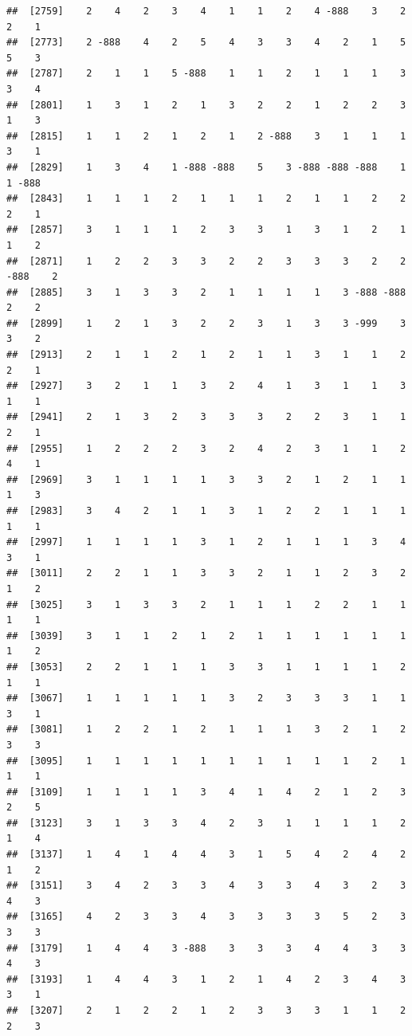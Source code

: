 \documentclass[
  12pt,
  openany]{book}
\begin{document}
\begin{verbatim}
##  [2759]    2    4    2    3    4    1    1    2    4 -888    3    2    2    1
##  [2773]    2 -888    4    2    5    4    3    3    4    2    1    5    5    3
##  [2787]    2    1    1    5 -888    1    1    2    1    1    1    3    3    4
##  [2801]    1    3    1    2    1    3    2    2    1    2    2    3    1    3
##  [2815]    1    1    2    1    2    1    2 -888    3    1    1    1    3    1
##  [2829]    1    3    4    1 -888 -888    5    3 -888 -888 -888    1    1 -888
##  [2843]    1    1    1    2    1    1    1    2    1    1    2    2    2    1
##  [2857]    3    1    1    1    2    3    3    1    3    1    2    1    1    2
##  [2871]    1    2    2    3    3    2    2    3    3    3    2    2 -888    2
##  [2885]    3    1    3    3    2    1    1    1    1    3 -888 -888    2    2
##  [2899]    1    2    1    3    2    2    3    1    3    3 -999    3    3    2
##  [2913]    2    1    1    2    1    2    1    1    3    1    1    2    2    1
##  [2927]    3    2    1    1    3    2    4    1    3    1    1    3    1    1
##  [2941]    2    1    3    2    3    3    3    2    2    3    1    1    2    1
##  [2955]    1    2    2    2    3    2    4    2    3    1    1    2    4    1
##  [2969]    3    1    1    1    1    3    3    2    1    2    1    1    1    3
##  [2983]    3    4    2    1    1    3    1    2    2    1    1    1    1    1
##  [2997]    1    1    1    1    3    1    2    1    1    1    3    4    3    1
##  [3011]    2    2    1    1    3    3    2    1    1    2    3    2    1    2
##  [3025]    3    1    3    3    2    1    1    1    2    2    1    1    1    1
##  [3039]    3    1    1    2    1    2    1    1    1    1    1    1    1    2
##  [3053]    2    2    1    1    1    3    3    1    1    1    1    2    1    1
##  [3067]    1    1    1    1    1    3    2    3    3    3    1    1    3    1
##  [3081]    1    2    2    1    2    1    1    1    3    2    1    2    3    3
##  [3095]    1    1    1    1    1    1    1    1    1    1    2    1    1    1
##  [3109]    1    1    1    1    3    4    1    4    2    1    2    3    2    5
##  [3123]    3    1    3    3    4    2    3    1    1    1    1    2    1    4
##  [3137]    1    4    1    4    4    3    1    5    4    2    4    2    1    2
##  [3151]    3    4    2    3    3    4    3    3    4    3    2    3    4    3
##  [3165]    4    2    3    3    4    3    3    3    3    5    2    3    3    3
##  [3179]    1    4    4    3 -888    3    3    3    4    4    3    3    4    3
##  [3193]    1    4    4    3    1    2    1    4    2    3    4    3    3    1
##  [3207]    2    1    2    2    1    2    3    3    3    1    1    2    2    3

\end{verbatim}
\end{document}
